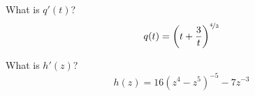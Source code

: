 \begin{ProblemSet}[pencil space=2in]
 \begin{Problem}
  What is $q'(t)$?
  \begin{equation*}
   q(t) = \left(t + \frac{3}{t}\right)^{\nicefrac{4}{3}}
  \end{equation*}
 \end{Problem}

 \begin{Problem}
  What is $h'(z)$?
  \begin{equation*}
   h(z) = 16 \left(z^4 - z^5\right)^{-5} - 7 z^{-3}
  \end{equation*}
 \end{Problem}


\end{ProblemSet}

